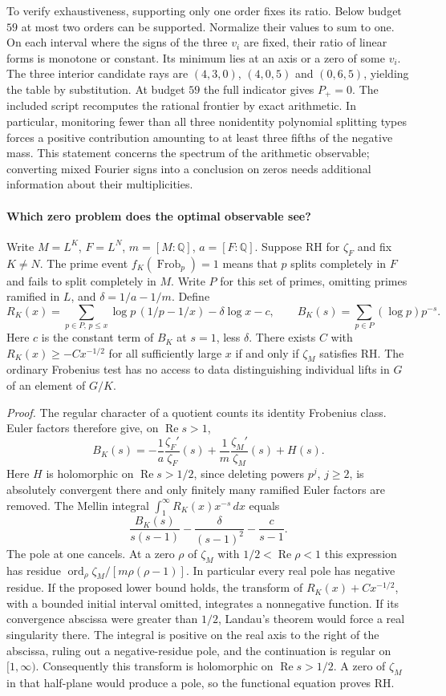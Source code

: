 To verify exhaustiveness, supporting only one order fixes its ratio. Below budget $59$ at most two orders can be supported. Normalize their values to sum to one. On each interval where the signs of the three $v_i$ are fixed, their ratio of linear forms is monotone or constant. Its minimum lies at an axis or a zero of some $v_i$. The three interior candidate rays are $(4,3,0)$, $(4,0,5)$ and $(0,6,5)$, yielding the table by substitution. At budget $59$ the full indicator gives $P_+=0$. The included script recomputes the rational frontier by exact arithmetic. In particular, monitoring fewer than all three nonidentity polynomial splitting types forces a positive contribution amounting to at least three fifths of the negative mass. This statement concerns the spectrum of the arithmetic observable; converting mixed Fourier signs into a conclusion on zeros needs additional information about their multiplicities.

\paragraph{Which zero problem does the optimal observable see?}
Write $M=L^K$, $F=L^N$, $m=[M:\mathbb Q]$, $a=[F:\mathbb Q]$. Suppose RH for $\zeta_F$ and fix $K\ne N$. The prime event $f_K(\operatorname{Frob}_p)=1$ means that $p$ splits completely in $F$ and fails to split completely in $M$. Write $P$ for this set of primes, omitting primes ramified in $L$, and $\delta=1/a-1/m$. Define
\[
 R_K(x)=\sum_{p\in P,\,p\le x}\log p\,(1/p-1/x)-\delta\log x-c,
\qquad B_K(s)=\sum_{p\in P}(\log p)p^{-s}.
\]
Here $c$ is the constant term of $B_K$ at $s=1$, less $\delta$. There exists $C$ with $R_K(x)\ge -C x^{-1/2}$ for all sufficiently large $x$ if and only if $\zeta_M$ satisfies RH. The ordinary Frobenius test has no access to data distinguishing individual lifts in $G$ of an element of $G/K$.

\medskip\noindent\emph{Proof.}
The regular character of a quotient counts its identity Frobenius class. Euler factors therefore give, on $\operatorname{Re}s>1$,
\[
 B_K(s)=-\frac1a\frac{\zeta_F'}{\zeta_F}(s)
         +\frac1m\frac{\zeta_M'}{\zeta_M}(s)+H(s).
\]
Here $H$ is holomorphic on $\operatorname{Re}s>1/2$, since deleting powers $p^j$, $j\ge2$, is absolutely convergent there and only finitely many ramified Euler factors are removed. The Mellin integral $\int_1^\infty R_K(x)x^{-s}\,dx$ equals
\[
 \frac{B_K(s)}{s(s-1)}-\frac{\delta}{(s-1)^2}-\frac{c}{s-1}.
\]
The pole at one cancels. At a zero $\rho$ of $\zeta_M$ with $1/2<\operatorname{Re}\rho<1$ this expression has residue $\operatorname{ord}_\rho\zeta_M/[m\rho(\rho-1)]$. In particular every real pole has negative residue. If the proposed lower bound holds, the transform of $R_K(x)+Cx^{-1/2}$, with a bounded initial interval omitted, integrates a nonnegative function. If its convergence abscissa were greater than $1/2$, Landau's theorem would force a real singularity there. The integral is positive on the real axis to the right of the abscissa, ruling out a negative-residue pole, and the continuation is regular on $[1,\infty)$. Consequently this transform is holomorphic on $\operatorname{Re}s>1/2$. A zero of $\zeta_M$ in that half-plane would produce a pole, so the functional equation proves RH.

